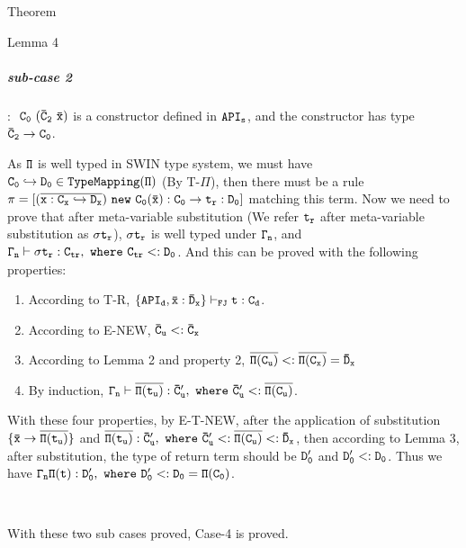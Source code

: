 \documentclass[GBK,winfonts,a4paper,11pt]{article}
\begin{document}
\begin{section}{Theorem}
\begin{subsection}{Lemma 4}
\subparagraph{sub-case 2}: $\tt\ C_0\ (\bar{C}_2\ \bar{x})$ is a constructor defined in $\tt API_s$, and the constructor has type $\tt \bar{C}_2\rightarrow C_0$.
\par
 As $\tt \Pi$ is well typed in SWIN type system, we must have $\tt C_0\hookrightarrow D_0\in TypeMapping(\Pi)$ (By T-$\Pi$), then there must be a rule $\tt\pi=[(\overline{x:C_x\hookrightarrow D_x})\ new\ C_0(\bar{x}):C_0 \rightarrow t_r:D_0]$ matching this term. 
 Now we need to prove that after meta-variable substitution (We refer $\tt t_r$ after meta-variable substitution as $\tt\sigma t_r$), $\tt\sigma t_r$ is well typed under $\tt\Gamma_n$, and $\tt\Gamma_n\vdash \sigma t_r:C_{tr},\ where\ C_{tr}<: D_0$. And this can be proved with the following properties:
\begin{enumerate}
%
%
%
\item According to T-R, $\tt \{API_d, \bar{x}:\bar{D}_x\}\vdash_{FJ}t:C_d$.
\item According to E-NEW, $\tt \bar{C}_u <: \bar{C}_x$ 
\item According to Lemma 2 and property 2, $\tt \overline{\Pi(C_u)}<: \overline{\Pi(C_x)}=\bar{D}_x$
\item By induction, $\tt \Gamma_n \vdash \overline{\Pi(t_u)}: \bar{C}'_u,\ where\ \bar{C}'_u <: \overline{\Pi(C_u)}$.
\end{enumerate}
With these four properties, by E-T-NEW, after the application of substitution $\tt \{\bar{x}\rightarrow\overline{\Pi(t_u)}\}$ and $\tt \overline{\Pi(t_u)}:\bar{C}'_u,\ where\ \bar{C}'_u <: \overline{\Pi(C_u)}<:\bar{D}_x$, then according to Lemma 3, after substitution, the type of return term should be $\tt D'_0$ and $\tt D'_0 <: D_0$. 
Thus we have $\tt\Gamma_n \Pi(t):D'_0,\ where\ D'_0 <: D_0 = \Pi(C_0)$. 
\par
\ 
\par
With these two sub cases proved, Case-4 is proved.


\end{subsection}
\end{section}
\end{document}

